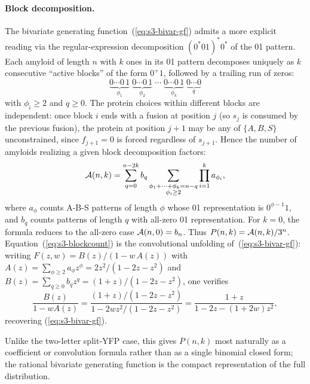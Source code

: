 \documentclass[11pt]{article}
\newcommand{\cA}{ {\cal A} }
\begin{document}
\paragraph{Block decomposition.} The bivariate generating function~(\ref{eq:s3-bivar-gf}) admits a more explicit reading via the regular-expression decomposition $(0^*01)^*0^*$ of the 01 pattern. Each amyloid of length $n$ with $k$ ones in its 01 pattern decomposes uniquely as $k$ consecutive ``active blocks'' of the form $0^+ 1$, followed by a trailing run of zeros:
\[
\underbrace{0\cdots 0\, 1}_{\phi_1} \; \underbrace{0\cdots 0\, 1}_{\phi_2} \; \cdots \; \underbrace{0\cdots 0\, 1}_{\phi_k} \; \underbrace{0\cdots 0}_{q}
\]
with $\phi_i \ge 2$ and $q \ge 0$. The protein choices within different blocks are independent: once block $i$ ends with a fusion at position $j$ (so $s_j$ is consumed by the previous fusion), the protein at position $j+1$ may be any of $\{A, B, S\}$ unconstrained, since $f_{j+1} = 0$ is forced regardless of $s_{j+1}$. Hence the number of amyloids realizing a given block decomposition factors:
\begin{equation}\label{eq:s3-blockcount}
\cA(n,k) = \sum_{q=0}^{n - 2k} b_q \sum_{\substack{\phi_1 + \cdots + \phi_k = n-q \\ \phi_i \ge 2}} \prod_{i=1}^k a_{\phi_i},
\end{equation}
where $a_\phi$ counts A-B-S patterns of length $\phi$ whose 01 representation is $0^{\phi-1} 1$, and $b_q$ counts patterns of length $q$ with all-zero 01 representation. For $k=0$, the formula reduces to the all-zero case $\cA(n,0)=b_n$. Thus $P(n,k)=\cA(n,k)/3^n$. Equation~(\ref{eq:s3-blockcount}) is the convolutional unfolding of~(\ref{eq:s3-bivar-gf}): writing $F(z, w) = B(z) / (1 - w\, A(z))$ with $A(z) = \sum_{\phi \ge 2} a_\phi z^\phi = 2 z^2 / (1 - 2z - z^2)$ and $B(z) = \sum_{q \ge 0} b_q z^q = (1+z)/(1 - 2z - z^2)$, one verifies
\[
\frac{B(z)}{1 - w A(z)} = \frac{(1+z)/(1 - 2z - z^2)}{1 - 2 w z^2/(1 - 2z - z^2)} = \frac{1 + z}{1 - 2z - (1 + 2w) z^2},
\]
recovering (\ref{eq:s3-bivar-gf}).

Unlike the two-letter split-YFP case, this gives $P(n,k)$ most naturally as a coefficient or convolution formula rather than as a single binomial closed form; the rational bivariate generating function is the compact representation of the full distribution.
\end{document}

